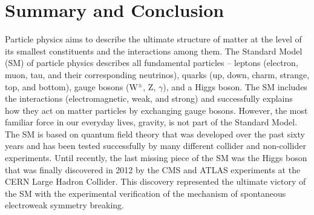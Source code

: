\graphicspath{{chapt_dutch/}{intro/}{chapt2/}{chapt3/}{chapt4/}{chapt5/}{chapt6/}{chapt7/}}
\renewcommand{\thesection}{\arabic{section}}    %

\renewcommand{\bibname}{References}
\renewcommand\evenpagerightmark{{\scshape\small Chapter 8}}
\renewcommand\oddpageleftmark{{\scshape\small Summary and Conclusion}}

\chapter[Summary and Conclusion]%
{Summary and Conclusion}\label{summary_conclusion}

\hyphenation{}
Particle physics aims to describe the ultimate structure of matter at the level of its smallest constituents and the interactions among them. 
The Standard Model (SM) of particle physics describes all fundamental particles – leptons (electron, muon, tau, and their corresponding neutrinos), quarks (up, down, charm, strange, top, and bottom), gauge bosons (W$^{\pm}$, Z, $\gamma$), and a Higgs boson. 
The SM includes the interactions (electromagnetic, weak, and strong) and successfully explains how they act on matter particles by exchanging gauge bosons. However, the most familiar force in our everyday lives, gravity, is not part of the Standard Model.
The SM is based on quantum field theory that was developed over the past sixty years and has been tested successfully by many different collider and non-collider experiments. Until recently, the last missing piece of the SM was the Higgs boson that was finally discovered in 2012 by the CMS and ATLAS experiments at the CERN Large Hadron Collider. This discovery represented the ultimate victory of the SM with the experimental verification of the mechanism of spontaneous electroweak symmetry breaking. 

